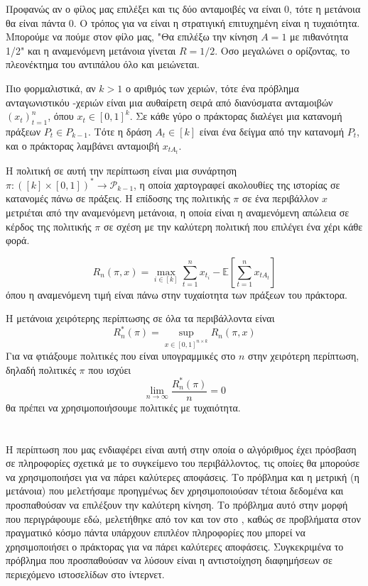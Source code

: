 Προφανώς αν ο φίλος μας επιλέξει και τις δύο ανταμοιβές να είναι 0, τότε η μετάνοια θα είναι πάντα 0. Ο τρόπος για να είναι η στρατιγική επιτυχημένη είναι η τυχαιότητα. Μπορούμε να πούμε στον φίλο μας, "Θα επιλέξω την κίνηση $A=1$ με πιθανότητα 1/2" και η αναμενόμενη μετάνοια γίνεται $R=1/2$.  Οσο μεγαλώνει ο ορίζοντας, το πλεονέκτημα του αντιπάλου όλο και μειώνεται. 

Πιο φορμαλιστικά, αν $k>1$ ο αριθμός των χεριών, τότε ένα πρόβλημα ανταγωνιστικόυ  -χεριών είναι μια αυθαίρετη σειρά από διανύσματα ανταμοιβών $(x_t)_{t=1}^n$, όπου $x_t \in [0,1]^k$. Σε κάθε γύρο ο πράκτορας διαλέγει μια κατανομή πράξεων $P_t \in P_{k-1}$. Τότε η δράση $A_t \in [k]$ είναι ένα δείγμα από την κατανομή $P_t$, και ο πράκτορας λαμβάνει ανταμοιβή $x_{tA_t}$.

Η πολιτική σε αυτή την περίπτωση είναι μια συνάρτηση $π: ([k] \times [0,1])^* \rightarrow \mathcal{P}_{k-1}$, η οποία χαρτογραφεί ακολουθίες της ιστορίας σε κατανομές πάνω σε πράξεις.
Η επίδοσης της πολιτικής $π$ σε ένα περιβάλλον $x$ μετριέται από την αναμενόμενη μετάνοια, η οποία είναι η αναμενόμενη απώλεια σε κέρδος της πολιτικής $π$ σε σχέση με την καλύτερη πολιτική που επιλέγει ένα χέρι κάθε φορά. 

\begin{equation}
R_n(π,x) = \max_{i \in [k]} \sum_{t=1}^n x_{t_i} - \mathbb{E}\left[\sum_{t=1}^n x_{tA_t}\right]   
\end{equation}
όπου η αναμενόμενη τιμή είναι πάνω στην τυχαίοτητα των πράξεων του πράκτορα.

Η μετάνοια χειρότερης περίπτωσης σε όλα τα περιβάλλοντα είναι
\begin{equation*}
    R_n^*(π) =  \sup_{x \in [0,1]^{n \times k}} R_n(π,x)
\end{equation*}
Για να φτιάξουμε πολιτικές που είναι υπογραμμικές στο $n$ στην χειρότερη περίπτωση, δηλαδή πολιτικές $π$ που ισχύει 
\begin{equation*}
    \lim_{n \to \infty} \frac{R^*_n(π)}{n} = 0
\end{equation*}
θα πρέπει να χρησιμοποιήσουμε πολιτικές με τυχαιότητα.

\section{}
Η περίπτωση  που μας ενδιαφέρει είναι αυτή στην οποία ο αλγόριθμος έχει πρόσβαση σε πληροφορίες σχετικά με το συγκείμενο του περιβάλλοντος, τις οποίες θα μπορούσε να χρησιμοποιήσει για να πάρει καλύτερες αποφάσεις. Το πρόβλημα και η μετρική (η μετάνοια) που μελετήσαμε προηγμένως δεν χρησιμοποιούσαν τέτοια δεδομένα και προσπαθούσαν να επιλέξουν την καλύτερη κίνηση. Το πρόβλημα αυτό στην μορφή που περιγράφουμε εδώ, μελετήθηκε από τον   και τον  στο \cite{langford_epoch-greedy_2007}, καθώς σε προβλήματα στον πραγματικό κόσμο πάντα υπάρχουν επιπλέον πληροφορίες που μπορεί να χρησιμοποιήσει ο πράκτορας για να πάρει καλύτερες αποφάσεις. Συγκεκριμένα το πρόβλημα που προσπαθούσαν να λύσουν είναι η αντιστοίχηση διαφημήσεων σε περιεχόμενο ιστοσελίδων στο ίντερνετ. 

